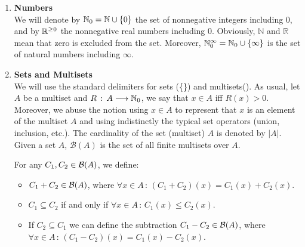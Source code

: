 \begin{enumerate}
\item {\bf Numbers}\\
We will denote by $\mathbb{N}_{0} = \mathbb{N} \cup \{0\}$ the set of nonnegative integers including 0,
and by $\mathbb{R}^{\geq 0}$ the nonnegative real numbers including 0. Obviously, $\mathbb{N}$
and $\mathbb{R}$ mean that zero is excluded from the set. Moreover,
$\mathbb{N}_{0}^{\infty} = \mathbb{N}_{0} \cup \left\{\infty \right\}$ is the set of natural numbers including $\infty$. 

\item {\bf Sets and Multisets}\\
We will use the standard delimiters for sets (\{\}) and multisets(\multiset{}). 
As usual, let $A$ be a multiset and $R\,:\,A \longrightarrow \mathbb{N}_{0}$, we say 
that $x \in A$ iff $R(x) > 0$.
Moreover, we abuse the notion using $x \in A$ to represent that $x$ is an element of
the multiset $A$ and using indistinctly the typical set operators (union, inclusion, etc.). The cardinality of the set (multiset) $A$
is denoted by $|A|$. Given a set $A$,
${\mathcal B}(A)$ is the set of all finite multisets over $A$.

For any $C_1, C_2 \in {\cal B}(A)$, we define:
\begin{itemize}
%
%
%
\item $C_1 + C_2 \in {\cal B}(A)$, where $\forall x \in A\,:\,
        (C_1+C_2)(x)= C_1(x) + C_2(x)$.
\item $C_1 \subseteq C_2$ if and only if $\forall x \in A\,:\,
        C_1(x) \leq C_2(x)$.
\item If $C_2 \subseteq C_1$ we can define the subtraction 
        $C_1 - C_2 \in {\cal B}(A)$, where $\forall x \in A\,:\,
        (C_1-C_2)(x)= C_1(x) - C_2(x)$.


\end{itemize}
\end{enumerate}
